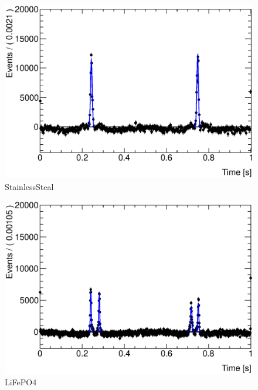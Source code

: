 \begin{figure}[htbp]
    \centering
        \includegraphics[scale=0.37, angle=0]{./StainlessSteel10000_fit}
    \caption{StainlessSteal}
    \label{fig:StainlessSteal}
\end{figure}

\begin{figure}[htbp]
    \centering
        \includegraphics[scale=0.37, angle=0]{./LiFePO4_100000_fit}
    \caption{LiFePO4}
    \label{fig:LiFePO4}
\end{figure}

